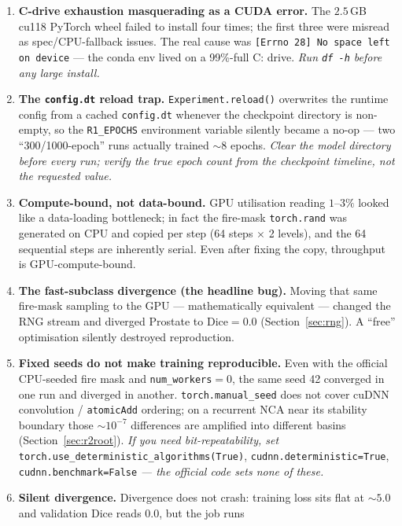 \documentclass[10pt,twocolumn]{article}
\newcommand{\dice}{\mathrm{Dice}}
\begin{document}
\begin{enumerate}[leftmargin=1.4em, itemsep=3pt]
\item \textbf{C-drive exhaustion masquerading as a CUDA error.} The
  $2.5$\,GB cu118 PyTorch wheel failed to install four times; the first
  three were misread as spec/CPU-fallback issues. The real cause was
  \texttt{[Errno 28] No space left on device} --- the conda env lived on a
  99\%-full C: drive. \emph{Run \texttt{df -h} before any large install.}
\item \textbf{The \texttt{config.dt} reload trap.}
  \texttt{Experiment.reload()} overwrites the runtime config from a cached
  \texttt{config.dt} whenever the checkpoint directory is non-empty, so the
  \texttt{R1\_EPOCHS} environment variable silently became a no-op ---
  two ``300/1000-epoch'' runs actually trained $\sim 8$ epochs. \emph{Clear
  the model directory before every run; verify the true epoch count from
  the checkpoint timeline, not the requested value.}
\item \textbf{Compute-bound, not data-bound.} GPU utilisation reading
  $1$--$3\%$ looked like a data-loading bottleneck; in fact the fire-mask
  \texttt{torch.rand} was generated on CPU and copied per step (64 steps
  $\times$ 2 levels), and the 64 sequential steps are inherently
  serial. Even after fixing the copy, throughput is GPU-compute-bound.
\item \textbf{The fast-subclass divergence (the headline bug).} Moving that
  same fire-mask sampling to the GPU --- mathematically equivalent ---
  changed the RNG stream and diverged Prostate to $\dice=0.0$
  (Section~\ref{sec:rng}). A ``free'' optimisation silently destroyed
  reproduction.
\item \textbf{Fixed seeds do not make training reproducible.} Even with the
  official CPU-seeded fire mask and \texttt{num\_workers}$=0$, the same seed
  42 converged in one run and diverged in another. \texttt{torch.manual\_seed}
  does not cover cuDNN convolution / \texttt{atomicAdd} ordering; on a
  recurrent NCA near its stability boundary those $\sim\!10^{-7}$ differences
  are amplified into different basins (Section~\ref{sec:r2root}).
  \emph{If you need bit-repeatability, set} \texttt{torch.use\_deterministic\_algorithms(True)},
  \texttt{cudnn.deterministic=True}, \texttt{cudnn.benchmark=False}
  \emph{--- the official code sets none of these.}
\item \textbf{Silent divergence.} Divergence does not crash: training loss
  sits flat at $\sim 5.0$ and validation Dice reads $0.0$, but the job runs

\end{enumerate}
\end{document}
